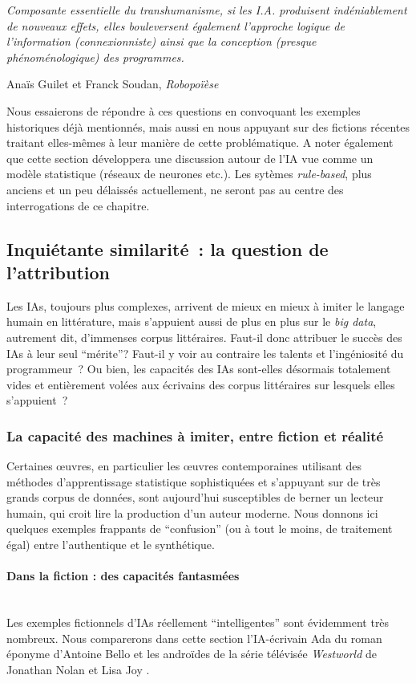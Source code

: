 \documentclass{article}
\newcommand{\subsubsubsection}[1]{\paragraph{#1}\mbox{}\\}
\newenvironment{citationbox}
{\begin{center}
		\begin{minipage}{.8\textwidth}
		}
		{
		\end{minipage}	
\end{center}
}
\begin{document}
		\begin{citationbox}
			\textit{Composante essentielle du transhumanisme, si les I.A. produisent indéniablement de nouveaux effets, elles bouleversent également l'approche logique de l'information (connexionniste) ainsi que la conception (presque phénoménologique) des programmes.}
			\begin{flushright}
				Anaïs Guilet et Franck Soudan, \textit{Robopoïèse} \cite{guilet2017}
			\end{flushright}
		\end{citationbox}
		Nous essaierons de répondre à ces questions en convoquant les exemples historiques déjà mentionnés, mais aussi en nous appuyant sur des fictions récentes traitant elles-mêmes à leur manière de cette problématique. A noter également que cette section développera une discussion autour de l'IA vue comme un modèle statistique (réseaux de neurones etc.). Les sytèmes \textit{rule-based}, plus anciens et un peu délaissés actuellement, ne seront pas au centre des interrogations de ce chapitre.
		\subsection{Inquiétante similarité~: la question de l'attribution}
			Les IAs, toujours plus complexes, arrivent de mieux en mieux à imiter le langage humain en littérature, mais s'appuient aussi de plus en plus sur le \textit{big data}, autrement dit, d'immenses corpus littéraires. Faut-il donc attribuer le succès des IAs à leur seul ``mérite''? Faut-il y voir au contraire les talents et l'ingéniosité du programmeur~? Ou bien, les capacités des IAs sont-elles désormais totalement vides et entièrement volées aux écrivains des corpus littéraires sur lesquels elles s'appuient~?
			\subsubsection{La capacité des machines à imiter, entre fiction et réalité}\label{fiction_vs_realite}
				Certaines œuvres, en particulier les œuvres contemporaines utilisant des méthodes d'apprentissage statistique sophistiquées et s'appuyant sur de très grands corpus de données, sont aujourd'hui susceptibles de berner un lecteur humain, qui croit lire la production d'un auteur moderne. Nous donnons ici quelques exemples frappants de ``confusion'' (ou à tout le moins, de traitement égal) entre l'authentique et le synthétique.
				\subsubsubsection{Dans la fiction : des capacités fantasmées}
					Les exemples fictionnels d'IAs réellement ``intelligentes'' sont évidemment très nombreux. Nous comparerons dans cette section l'IA-écrivain Ada du roman éponyme d'Antoine Bello \cite{bello2016} et les androïdes de la série télévisée \textit{Westworld} de Jonathan Nolan et Lisa Joy \cite{westworld}.\\
					
\end{document}
